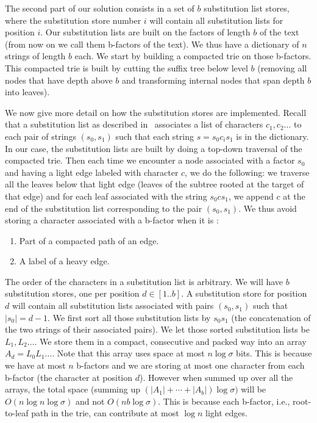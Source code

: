 \documentclass{article}
\newcommand{\?}{\mskip1.5mu}
\begin{document}
The second part of our solution consists in a set of $b$ substitution list stores, where the substitution store number $i$ will contain all substitution lists for position $i$. 
Our substitution lists are built on the factors of length $b$ of the text (from now on we call them b-factors of the text). We thus have a dictionary of $n$ strings of length $b$ each. 
We start by building a compacted trie on those b-factors. This compacted trie is built by cutting the suffix tree below level $b$ (removing all nodes that have depth above $b$ and transforming internal nodes that span depth $b$ into leaves). 

We now give more detail on how the substitution stores are implemented. Recall that a substitution list as described in~\cite{B09} associates a list of characters $c_1,c_2\ldots$  to each pair of strings $(s_0,s_1)$ such that each string $s=s_0c_is_1$ is in the dictionary. In our case, the substitution lists are built by doing a top-down traversal of the compacted trie. Then each time we encounter a node associated with a factor $s_0$ and having a light edge labeled with character $c$, we do the following: we traverse all the leaves below that light edge (leaves of the subtree rooted at the target of that edge) and for each leaf associated with the string $s_0cs_1$, we append $c$ at the end of the substitution list corresponding to the pair $(s_0,s_1)$. 
We thus avoid storing a character associated with a b-factor when it is :
\begin{enumerate}
\item Part of a compacted path of an edge. 
\item A label of a heavy edge. 
\end{enumerate}
The order of the characters in a substitution list is arbitrary. We will have $b$ substitution stores, one per position $d\in[1..b]$. 
A substitution store for position $d$ will contain all substitution lists associated with pairs $(s_0,s_1)$ such that $|s_0|=d-1$. We first sort all those substitution lists by $s_0s_1$ (the concatenation of the two strings of their associated pairs). 
We let those sorted substitution lists be $L_1,L_2\ldots$. We store them in a compact, consecutive and packed way into an array $A_d=L_0L_1\ldots$. Note that this array uses space at most $n\log\sigma$ bits. This is because we have at most $n$ b-factors and we are storing at most one character from each b-factor (the character at position $d$). However when summed up over all the arrays, the total space (summing up $(|A_1|+\cdots+|A_b|)\log\sigma)$ will be $O(n\log n\log\sigma)$ and not $O(nb\log\sigma)$.
This is because each b-factor, i.e., root-to-leaf path in the trie, can contribute at most $\log n$ light edges. 
\end{document}
